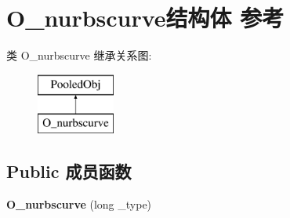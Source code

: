 \hypertarget{struct_o__nurbscurve}{}\section{O\+\_\+nurbscurve结构体 参考}
\label{struct_o__nurbscurve}
类 O\+\_\+nurbscurve 继承关系图\+:\begin{figure}[H]
\begin{center}
\leavevmode
\includegraphics[height=2.000000cm]{struct_o__nurbscurve}
\end{center}
\end{figure}
\subsection*{Public 成员函数}
\begin{DoxyCompactItemize}
\item 
\mbox{\label{struct_o__nurbscurve_acedbc93da6dbe5d4e7ff5d01bd3c3390}} 
{\bfseries O\+\_\+nurbscurve} (long \+\_\+type)
\end{DoxyCompactItemize}
